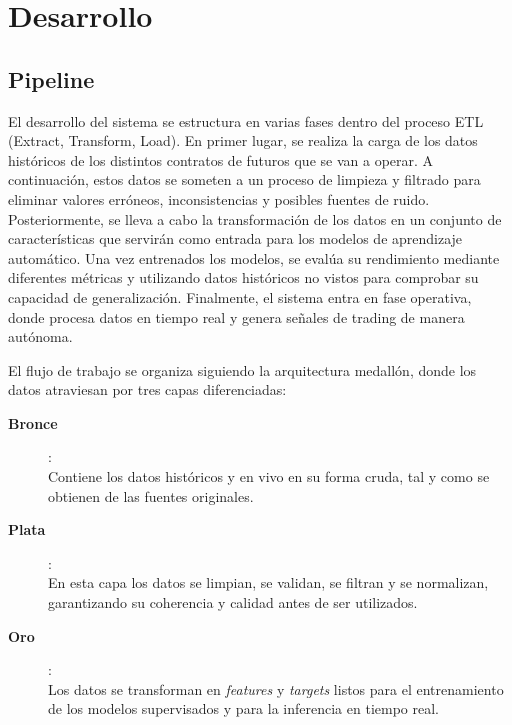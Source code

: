\setlength{\parindent}{0em}

\chapter{Desarrollo}\label{cap3}\thispagestyle{fancy}

\vspace{-1.3cm}

\section{Pipeline}

El desarrollo del sistema se estructura en varias fases dentro del proceso ETL (Extract, Transform, Load). En primer lugar, se realiza la carga de los
datos históricos de los distintos contratos de futuros que se van a operar. A continuación, estos datos se someten a un proceso de limpieza y filtrado
para eliminar valores erróneos, inconsistencias y posibles fuentes de ruido. Posteriormente, se lleva a cabo la transformación de los datos en un
conjunto de características que servirán como entrada para los modelos de aprendizaje automático. Una vez entrenados los modelos, se evalúa su
rendimiento mediante diferentes métricas y utilizando datos históricos no vistos para comprobar su capacidad de generalización. Finalmente, el sistema
entra en fase operativa, donde procesa datos en tiempo real y genera señales de trading de manera autónoma.

El flujo de trabajo se organiza siguiendo la arquitectura medallón, donde los datos atraviesan por tres capas diferenciadas:

\begin{description}
    \item[\textbf{Bronce}]:  \hfill \\
    Contiene los datos históricos y en vivo en su forma cruda, tal y como se obtienen de las fuentes originales.
    \item[\textbf{Plata}]:  \hfill \\
    En esta capa los datos se limpian, se validan, se filtran y se normalizan, garantizando su coherencia y calidad antes de ser utilizados.
    \item[\textbf{Oro}]:  \hfill \\
    Los datos se transforman en \textit{features} y \textit{targets} listos para el entrenamiento de los modelos supervisados y para la inferencia en
    tiempo real.
\end{description}


